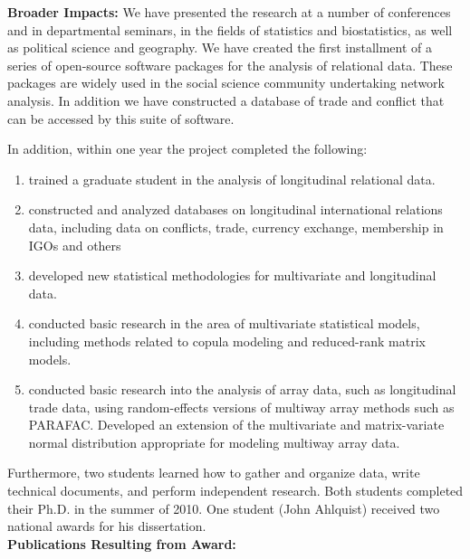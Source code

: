 \documentclass[pdftex,12pt,fullpage,oneside]{amsart}
\begin{document}
\textbf{Broader Impacts:} We have presented the research at a number of conferences and in departmental seminars, in the fields of statistics and biostatistics, as well as political science and geography. We have created the first installment of a series of open-source software packages for the analysis of relational data. These packages are widely used in the social science community undertaking network analysis. In addition we have constructed a database of trade and conflict that can be accessed by this suite of software. 


\noindent In addition, within one year the project completed the following:
\begin{enumerate}

\item  trained a graduate student in the analysis of longitudinal relational data. 

\item constructed and analyzed databases on longitudinal international relations data, including data on conflicts, trade, currency exchange, membership in IGOs and others

\item developed new statistical methodologies for multivariate and longitudinal data. 

\item conducted basic research in the area of multivariate statistical models, including methods related to copula modeling and reduced-rank matrix models. 

\item conducted basic research into the analysis of array data, such as longitudinal trade data, using random-effects versions of multiway array methods such as PARAFAC. Developed an extension of the multivariate and matrix-variate normal distribution appropriate for modeling multiway array data. 

\end{enumerate}

Furthermore, two students learned how to gather and organize data, write technical documents, and perform independent research. Both students completed their Ph.D. in the summer of 2010. One student (John Ahlquist) received two national awards for his dissertation. 
\\

\textbf{Publications Resulting from Award:}
\end{document}
